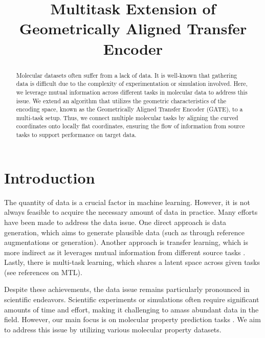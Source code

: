 
\title{Multitask Extension of \\ Geometrically Aligned Transfer Encoder}
\maketitle
\def\thefootnote{*}\def\thefootnote{\arabic{footnote}}

\begin{abstract}
Molecular datasets often suffer from a lack of data. It is well-known that gathering data is difficult due to the complexity of experimentation or simulation involved. Here, we leverage mutual information across different tasks in molecular data to address this issue. We extend an algorithm that utilizes the geometric characteristics of the encoding space, known as the Geometrically Aligned Transfer Encoder (GATE), to a multi-task setup. Thus, we connect multiple molecular tasks by aligning the curved coordinates onto locally flat coordinates, ensuring the flow of information from source tasks to support performance on target data.
\end{abstract}


\section{Introduction}
The quantity of data is a crucial factor in machine learning. However, it is not always feasible to acquire the necessary amount of data in practice. Many efforts have been made to address the data issue. One direct approach is data generation, which aims to generate plausible data (such as through reference augmentations or generation). Another approach is transfer learning, which is more indirect as it leverages mutual information from different source tasks \cite{https://doi.org/10.1002/sam.10099, doi:10.1137/1.9781611972825.47, 10.1145/2433396.2433449, 6606822, 9051683, Quattoni, Kulis2011WhatYS, DBLP:journals/corr/abs-1902-07208, YU2022230, wang2019, doi:10.1073/pnas.2024383118}. Lastly, there is multi-task learning, which shares a latent space across given tasks (see references on MTL).

Despite these achievements, the data issue remains particularly pronounced in scientific endeavors. Scientific experiments or simulations often require significant amounts of time and effort, making it challenging to amass abundant data in the field. However, our main focus is on molecular property prediction tasks \cite{scarselli2009, bruna2013, duvenaud2015, defferrard2016, jin2018, C8SC04228D, ko2023grouping}. We aim to address this issue by utilizing various molecular property datasets.


